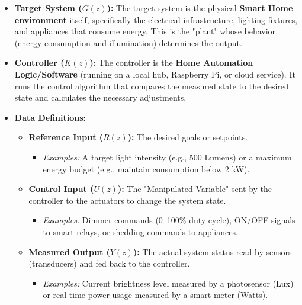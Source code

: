 \documentclass[a4paper,12pt]{article}
\begin{document}
\begin{itemize}
    \item \textbf{Target System ($G(z)$):} 
    The target system is the physical \textbf{Smart Home environment} itself, specifically the electrical infrastructure, lighting fixtures, and appliances that consume energy. This is the "plant" whose behavior (energy consumption and illumination) determines the output.

    \item \textbf{Controller ($K(z)$):} 
    The controller is the \textbf{Home Automation Logic/Software} (running on a local hub, Raspberry Pi, or cloud service). It runs the control algorithm that compares the measured state to the desired state and calculates the necessary adjustments.

    \item \textbf{Data Definitions:}
    \begin{itemize}
        \item \textbf{Reference Input ($R(z)$):} The desired goals or setpoints. 
        \begin{itemize}
            \item \textit{Examples:} A target light intensity (e.g., 500 Lumens) or a maximum energy budget (e.g., maintain consumption below 2 kW).
        \end{itemize}
        
        \item \textbf{Control Input ($U(z)$):} The "Manipulated Variable" sent by the controller to the actuators to change the system state.
        \begin{itemize}
            \item \textit{Examples:} Dimmer commands (0--100\% duty cycle), ON/OFF signals to smart relays, or shedding commands to appliances.
        \end{itemize}
        
        \item \textbf{Measured Output ($Y(z)$):} The actual system status read by sensors (transducers) and fed back to the controller.
        \begin{itemize}
            \item \textit{Examples:} Current brightness level measured by a photosensor (Lux) or real-time power usage measured by a smart meter (Watts).
        \end{itemize}
    \end{itemize}
\end{itemize}
\end{document}
